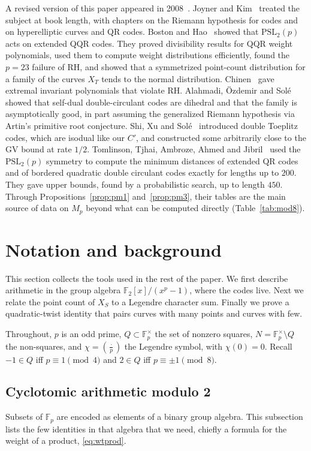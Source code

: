 \documentclass[12pt,letterpaper]{article}
\theoremstyle{definition}
\theoremstyle{remark}
\numberwithin{equation}{section}
\newcommand{\F}{\mathbb{F}}
\newcommand{\Fp}{\mathbb{F}_p}
\begin{document}
A revised version of this paper appeared in 2008~\cite{Jo08}. Joyner and
Kim~\cite{JK11} treated the subject at book length, with chapters on the Riemann
hypothesis for codes and on hyperelliptic curves and QR codes. Boston and
Hao~\cite{BH17} showed that $\mathrm{PSL}_2(p)$ acts on extended QQR codes. They
proved divisibility results for QQR weight polynomials, used them to compute
weight distributions efficiently, found the $p=23$ failure of RH, and showed that a
symmetrized point-count distribution for a family of the curves $X_T$ tends to the
normal distribution. Chinen~\cite{Ch17} gave extremal invariant polynomials that
violate RH. Alahmadi, \"Ozdemir and Sol\'e~\cite{AOS18} showed that self-dual
double-circulant codes are dihedral and that the family is asymptotically good, in
part assuming the generalized Riemann hypothesis via Artin's primitive root
conjecture. Shi, Xu and Sol\'e~\cite{SXS21} introduced double Toeplitz codes, which
are isodual like our $C'$, and constructed some arbitrarily close to the GV bound at
rate $1/2$. Tomlinson, Tjhai, Ambroze, Ahmed and Jibril~\cite[Ch.~9]{TTAAJ17} used
the $\mathrm{PSL}_2(p)$ symmetry to compute the minimum distances of extended QR
codes and of bordered quadratic double circulant codes exactly for lengths up to
$200$. They gave upper bounds, found by a probabilistic search, up to length
$450$. Through Propositions~\ref{prop:pm1} and~\ref{prop:pm3}, their tables are the
main source of data on $M_p$ beyond what can be computed directly
(Table~\ref{tab:mod8}).

\section{Notation and background}
\label{sec:notation}

This section collects the tools used in the rest of the paper. We first describe
arithmetic in the group algebra $\F_2[x]/(x^p-1)$, where the codes live. Next we
relate the point count of $X_S$ to a Legendre character sum. Finally we prove a
quadratic-twist identity that pairs curves with many points and curves with few.

Throughout, $p$ is an odd prime, $Q\subset\Fp^\times$ the set of nonzero squares,
$N=\Fp^\times\setminus Q$ the non-squares, and $\chi=\left(\frac{\cdot}{p}\right)$
the Legendre symbol, with $\chi(0)=0$. Recall $-1\in Q$ iff $p\equiv1\pmod4$ and
$2\in Q$ iff $p\equiv\pm1\pmod8$.

\subsection{Cyclotomic arithmetic modulo 2}
Subsets of $\Fp$ are encoded as elements of a binary group algebra. This
subsection lists the few identities in that algebra that we need, chiefly a formula
for the weight of a product, \eqref{eq:wtprod}.
\end{document}
